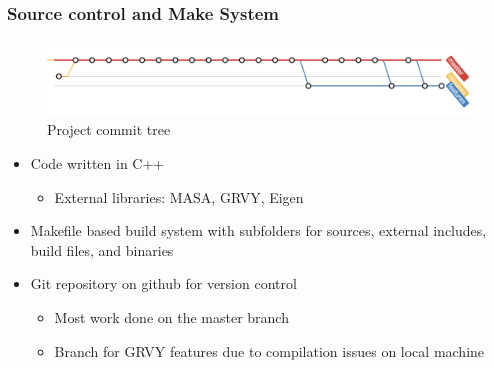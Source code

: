 \documentclass[unknownkeysallowed,12pt,mathserif]{beamer}
\begin{document}
\begin{frame}                                                                                                                                                                          
\frametitle{Source control and Make System}
\begin{center}

\begin{figure}[!htbp] 
\includegraphics[width=.8\linewidth]{git_graph.png}
\caption{\footnotesize Project commit tree\footnotemark}\label{fig:ct_fit}
\end{figure}

\begin{itemize}

\item Code written in C++

\begin{itemize}
\item External libraries: MASA, GRVY, Eigen
\end{itemize}

\item Makefile based build system with subfolders for sources, external includes, build files, and binaries
\item Git repository on github for version control

\begin{itemize}
\item Most work done on the master branch
\item Branch for GRVY features due to compilation issues on local machine
\end{itemize}

\end{itemize}

\end{center}

\end{frame}   
\end{document}
